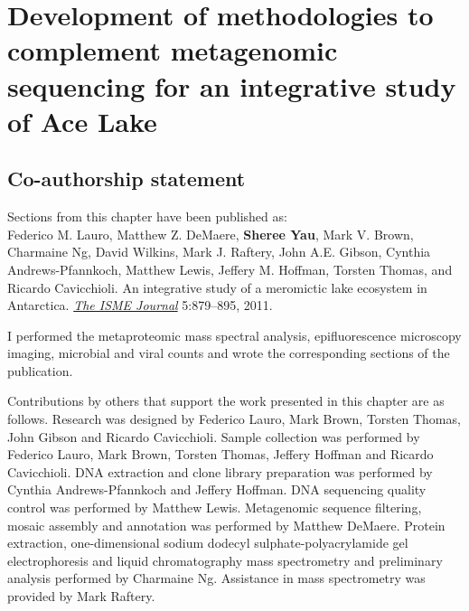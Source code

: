 \chapter[Development of methodologies to complement metagenomic sequencing for an integrative study of Ace Lake]{Development of methodologies to complement metagenomic sequencing for an integrative study of  Ace Lake}
\label{ch:ace}
\acresetall

\section*{Co-authorship statement}

Sections from this chapter have been published as:\\

Federico M. Lauro, Matthew Z. DeMaere, \textbf{Sheree Yau}, Mark V. Brown, Charmaine Ng,
David Wilkins, Mark J. Raftery, John A.E. Gibson, Cynthia Andrews-Pfannkoch, Matthew Lewis,
Jeffery M. Hoffman, Torsten Thomas, and Ricardo Cavicchioli. 
An integrative study of a meromictic lake ecosystem in Antarctica. \emph{\underline{The ISME Journal}} 
5:879--895, 2011.

I performed the metaproteomic mass spectral analysis, epifluorescence microscopy imaging,
microbial and viral counts and wrote the corresponding sections of the publication.

Contributions by others that support the work presented in this chapter are as follows.
Research was designed by Federico Lauro, Mark Brown, Torsten Thomas, John Gibson and Ricardo Cavicchioli.
Sample collection was performed by Federico Lauro, Mark Brown, Torsten Thomas, Jeffery Hoffman and Ricardo Cavicchioli.
\textsc{DNA} extraction and clone library preparation was performed by Cynthia Andrews-Pfannkoch and Jeffery Hoffman.
\textsc{DNA} sequencing quality control was performed by Matthew Lewis.
Metagenomic sequence filtering, mosaic assembly and annotation was performed by Matthew DeMaere.
Protein extraction, one-dimensional sodium dodecyl sulphate-polyacrylamide gel electrophoresis and liquid chromatography mass spectrometry and preliminary analysis performed by Charmaine Ng.
Assistance in mass spectrometry was provided by Mark Raftery.
\newpage

